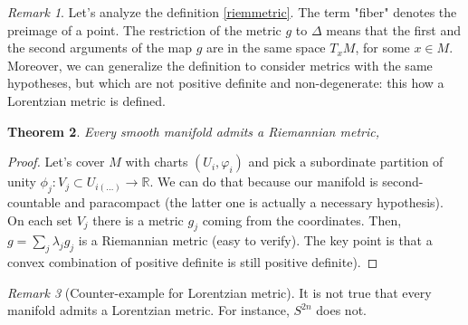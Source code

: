 \documentclass[a4paper,11pt,titlepage, article, oneside]{memoir}
\numberwithin{equation}{section}
\newtheorem{theorem}{Theorem}[section]
\theoremstyle{definition}
\theoremstyle{remark}
\newtheorem{remark}[theorem]{Remark}
\newcommand{\rfield}{\mathbb{R}}
\begin{document}
\begin{remarkbox}\begin{remark}
Let's analyze the definition \ref{riemmetric}. The term "fiber" denotes the preimage of a point. The restriction of the metric $g$ to $\Delta$ means that the first and the second arguments of the map $g$ are in the same space $T_x M$, for some $x \in M$. Moreover, we can generalize the definition to consider metrics with the same hypotheses, but which are not positive definite and non-degenerate: this how a Lorentzian metric is defined.
\end{remark}\end{remarkbox}

\begin{theorem}
Every smooth manifold admits a Riemannian metric,
\end{theorem}
\begin{proof}
Let's cover $M$ with charts $(U_i, \varphi_i)$ and pick a subordinate partition of unity $\phi_j \colon V_j \subset U_{i(\ldots)}\rightarrow \rfield$. We can do that because our manifold is second-countable and paracompact (the latter one is actually a necessary hypothesis). On each set $V_j$ there is a metric $g_j$ coming from the coordinates. Then, $g = \sum\limits_j \lambda_j g_j$ is a Riemannian metric (easy to verify). The key point is that a convex combination of positive definite is still positive definite).
\end{proof}

\begin{remarkbox}\begin{remark}[Counter-example for Lorentzian metric]
It is not true that every manifold admits a Lorentzian metric. For instance, $S^{2n}$ does not.
\end{remark}\end{remarkbox}
\end{document}
